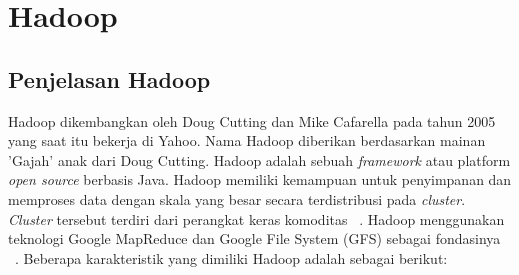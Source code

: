 \section{Hadoop}

\subsection{Penjelasan Hadoop}

Hadoop dikembangkan oleh Doug Cutting dan Mike Cafarella pada tahun 2005 yang saat itu bekerja di Yahoo. Nama Hadoop diberikan berdasarkan mainan 'Gajah' anak dari Doug Cutting. Hadoop adalah sebuah \textit{framework} atau platform \textit{open source} berbasis Java. Hadoop memiliki kemampuan untuk penyimpanan dan memproses data dengan skala yang besar secara terdistribusi pada {\it cluster}. {\it Cluster} tersebut terdiri dari perangkat keras komoditas ~\cite{alexholmes:04:hip}. Hadoop menggunakan teknologi Google MapReduce dan Google File System (GFS) sebagai fondasinya ~\cite{tomwhite:05:htdg}. Beberapa karakteristik yang dimiliki Hadoop adalah sebagai berikut:


